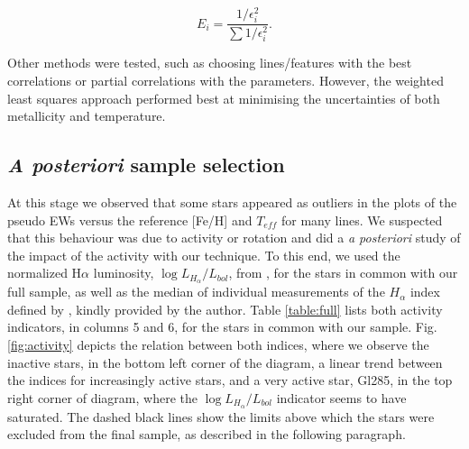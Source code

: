 \documentclass{aa}
\begin{document}


\begin{equation}
E_{i} = \frac{1/\epsilon_{i}^{2}}{\sum{1/\epsilon_{i}^{2}}}.
\label{eq:weight}
\end{equation}

Other methods were tested, such as choosing lines/features with the best correlations or partial correlations with the parameters. However, the weighted least squares approach performed best at minimising the uncertainties of both metallicity and temperature. 

\subsection{\textit{A posteriori} sample selection}
\label{sec:sample}

At this stage we observed that some stars appeared as outliers in the plots of the pseudo EWs versus the reference [Fe/H] and $T_{eff}$ for many lines. We suspected that this behaviour was due to activity or rotation and did a \textit{a posteriori} study of the impact of the activity with our technique. To this end, we used the normalized H$\alpha$ luminosity, $\log{L_{H_{\alpha}}/L_{bol}}$, from \citet{Reiners-2012}, for the stars in common with our full sample, as well as the median of individual measurements of the $H_{\alpha}$ index defined by \citet{Gomes_da_Silva-2011}, kindly provided by the author. Table \ref{table:full} lists both activity indicators, in columns 5 and 6, for the stars in common with our sample. Fig. \ref{fig:activity} depicts the relation between both indices, where we observe the inactive stars, in the bottom left corner of the diagram, a linear trend between the indices for increasingly active stars, and a very active star, Gl285, in the top right corner of diagram, where the  $\log{L_{H_{\alpha}}/L_{bol}}$ indicator seems to have saturated. The dashed black lines show the limits above which the stars were excluded from the final sample, as described in the following paragraph. 
\end{document}
